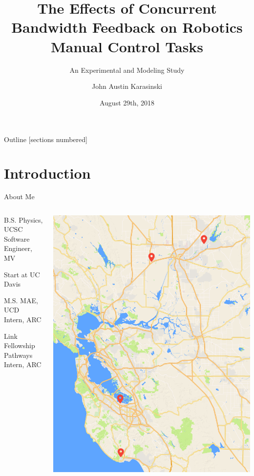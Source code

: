 \documentclass[10pt]{beamer}
\title{The Effects of Concurrent Bandwidth Feedback on Robotics Manual Control Tasks}
\subtitle{An Experimental and Modeling Study}
\date{August 29th, 2018}
\author{John Austin Karasinski}
\institute{Qualifying Examination}
\begin{document}
\maketitle

\begin{frame}{Outline}
  [sections numbered]
  \tableofcontents[]
\end{frame}

\section{Introduction}

\begin{frame}[fragile]{About Me}
  \begin{columns}[T]
    \begin{column}{.6\textwidth}
      \begin{description}[align=right]
        \setlength\itemsep{1em}
        \item [2012] B.S. Physics, UCSC\\
              Software Engineer, MV
        \item [2013] Start at UC Davis
        \item [2016] M.S. MAE, UCD\\
              Intern, ARC
        \item [2017] Link Fellowship\\
              Pathways Intern, ARC
      \end{description}
    \end{column}
    \begin{column}{.4\textwidth}
      \includegraphics[width=\textwidth]{../img/california.png}

\end{column}
\end{columns}
\end{frame}
\end{document}
